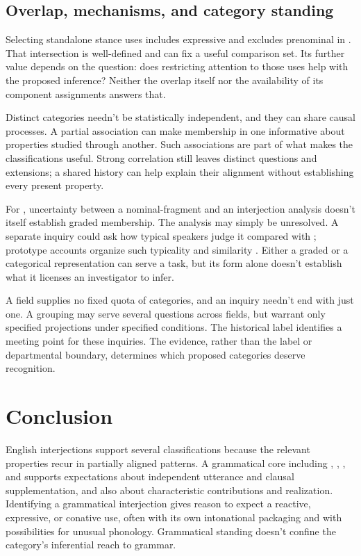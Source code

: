 \documentclass[12pt]{article}
\begin{document}
\subsection{Overlap, mechanisms, and category standing}

Selecting standalone stance uses includes expressive 
and excludes prenominal  in . That
intersection is well-defined and can fix a useful comparison set.
Its further value depends on the question: does restricting attention
to those uses help with the proposed inference? Neither the overlap
itself nor the availability of its component assignments answers that.

Distinct categories needn't be statistically independent, and they can
share causal processes. A partial association can make membership in
one informative about properties studied through another. Such associations
are part of what makes the classifications useful. Strong correlation
still leaves distinct questions and extensions; a shared history can
help explain their alignment without establishing every present property.

For , uncertainty between a nominal-fragment and an
interjection analysis doesn't itself establish graded membership. The
analysis may simply be unresolved. A separate inquiry could ask how
typical speakers judge it compared with ; prototype
accounts organize such typicality and similarity \citep{rosch1975,taylor2003}.
Either a graded or a categorical representation can serve a task,
but its form alone doesn't establish what it licenses an investigator
to infer.

A field supplies no fixed quota of categories, and an inquiry
needn't end with just one. A grouping may serve several questions across
fields, but warrant only specified projections under specified conditions.
The historical label  identifies a meeting point for
these inquiries. The evidence, rather than the label or departmental
boundary, determines which proposed categories deserve recognition.

\section{Conclusion}\label{sec:conclusion}

English interjections support several classifications because the relevant
properties recur in partially aligned patterns. A grammatical core including
, , , and  supports
expectations about independent utterance and clausal supplementation, and
also about characteristic contributions and realization. Identifying a
grammatical interjection gives reason to expect a reactive, expressive,
or conative use, often with its own intonational packaging and with
possibilities for unusual phonology. Grammatical standing doesn't confine
the category's inferential reach to grammar.
\end{document}

